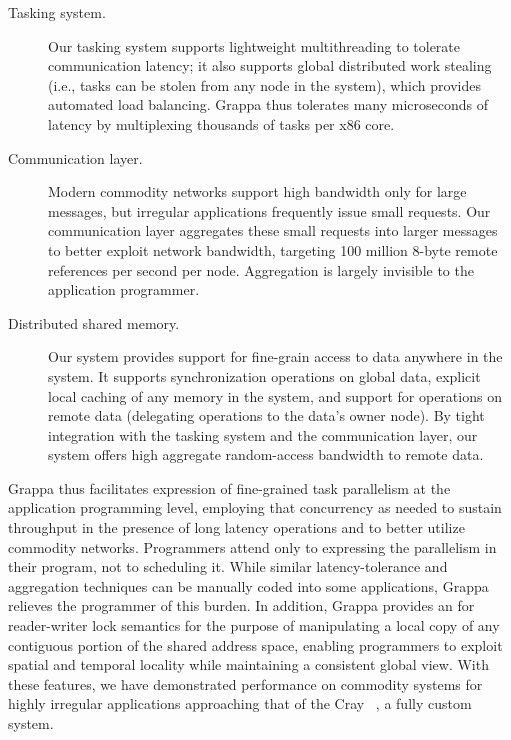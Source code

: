 \begin{description}

\item [Tasking system.] Our tasking system supports lightweight
multithreading to tolerate communication latency; it also supports global distributed
work stealing (i.e., tasks can be stolen from any node in the system), which
provides automated load balancing.  Grappa thus tolerates many
microseconds of latency by multiplexing thousands of tasks per x86 core.

\item[Communication layer.] Modern commodity networks
support high bandwidth only for large messages, but irregular applications
frequently issue small requests.   Our communication layer aggregates these small requests into larger messages to better exploit network bandwidth, targeting 100 million 8-byte remote references per second per node.  Aggregation is largely invisible to the application programmer.

\item[Distributed shared memory.] Our  system provides support for
fine-grain access to data anywhere in the system. It supports synchronization
operations on global data, explicit local caching of any memory in the system,
and support for operations on remote data (delegating operations to the data's owner node).
By tight integration with the tasking system and the
communication layer, our  system offers high aggregate random-access bandwidth to remote data.


\end{description}
Grappa thus facilitates
expression of fine-grained task parallelism at the application
programming level, employing that concurrency as needed to sustain throughput in the presence of long latency operations and to better utilize commodity networks.  Programmers attend only to expressing the parallelism in their program, not to scheduling it.  While similar latency-tolerance and aggregation techniques can be manually coded into some
applications, Grappa relieves the programmer of this burden.  In
addition, Grappa provides an  for reader-writer lock semantics for the
purpose of manipulating a local copy of any contiguous portion of the
shared address space, enabling programmers to exploit spatial and
temporal locality while maintaining a consistent global view.  With
these features, we have demonstrated performance on commodity systems
for highly irregular applications approaching that of the Cray ~\cite{feo:xmt}, a
fully custom system.

